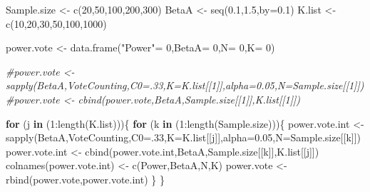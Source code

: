 \documentclass[
]{book}
\newenvironment{Shaded}{\begin{snugshade}}{\end{snugshade}}
\newcommand{\AttributeTok}[1]{\textcolor[rgb]{0.77,0.63,0.00}{#1}}
\newcommand{\CommentTok}[1]{\textcolor[rgb]{0.56,0.35,0.01}{\textit{#1}}}
\newcommand{\ControlFlowTok}[1]{\textcolor[rgb]{0.13,0.29,0.53}{\textbf{#1}}}
\newcommand{\DecValTok}[1]{\textcolor[rgb]{0.00,0.00,0.81}{#1}}
\newcommand{\FloatTok}[1]{\textcolor[rgb]{0.00,0.00,0.81}{#1}}
\newcommand{\FunctionTok}[1]{\textcolor[rgb]{0.00,0.00,0.00}{#1}}
\newcommand{\NormalTok}[1]{#1}
\newcommand{\OtherTok}[1]{\textcolor[rgb]{0.56,0.35,0.01}{#1}}
\newcommand{\SpecialCharTok}[1]{\textcolor[rgb]{0.00,0.00,0.00}{#1}}
\newcommand{\StringTok}[1]{\textcolor[rgb]{0.31,0.60,0.02}{#1}}
\theoremstyle{definition}
\theoremstyle{definition}
\theoremstyle{definition}
\theoremstyle{definition}
\theoremstyle{remark}
\begin{document}
\begin{Shaded}
\begin{Highlighting}[]
\NormalTok{Sample.size }\OtherTok{\textless{}{-}} \FunctionTok{c}\NormalTok{(}\DecValTok{20}\NormalTok{,}\DecValTok{50}\NormalTok{,}\DecValTok{100}\NormalTok{,}\DecValTok{200}\NormalTok{,}\DecValTok{300}\NormalTok{)}
\NormalTok{BetaA }\OtherTok{\textless{}{-}} \FunctionTok{seq}\NormalTok{(}\FloatTok{0.1}\NormalTok{,}\FloatTok{1.5}\NormalTok{,}\AttributeTok{by=}\FloatTok{0.1}\NormalTok{)}
\NormalTok{K.list }\OtherTok{\textless{}{-}} \FunctionTok{c}\NormalTok{(}\DecValTok{10}\NormalTok{,}\DecValTok{20}\NormalTok{,}\DecValTok{30}\NormalTok{,}\DecValTok{50}\NormalTok{,}\DecValTok{100}\NormalTok{,}\DecValTok{1000}\NormalTok{)}

\NormalTok{power.vote }\OtherTok{\textless{}{-}} \FunctionTok{data.frame}\NormalTok{(}\StringTok{"Power"}\OtherTok{=} \DecValTok{0}\NormalTok{,}\StringTok{\textquotesingle{}BetaA\textquotesingle{}}\OtherTok{=} \DecValTok{0}\NormalTok{,}\StringTok{\textquotesingle{}N\textquotesingle{}}\OtherTok{=} \DecValTok{0}\NormalTok{,}\StringTok{\textquotesingle{}K\textquotesingle{}}\OtherTok{=} \DecValTok{0}\NormalTok{)}
  
\CommentTok{\#power.vote \textless{}{-} sapply(BetaA,VoteCounting,C0=.33,K=K.list[[1]],alpha=0.05,N=Sample.size[[1]])}
\CommentTok{\#power.vote \textless{}{-} cbind(power.vote,BetaA,Sample.size[[1]],K.list[[1]])}

\ControlFlowTok{for}\NormalTok{ (j }\ControlFlowTok{in}\NormalTok{ (}\DecValTok{1}\SpecialCharTok{:}\FunctionTok{length}\NormalTok{(K.list)))\{}
  \ControlFlowTok{for}\NormalTok{ (k }\ControlFlowTok{in}\NormalTok{ (}\DecValTok{1}\SpecialCharTok{:}\FunctionTok{length}\NormalTok{(Sample.size)))\{}
\NormalTok{    power.vote.int }\OtherTok{\textless{}{-}} \FunctionTok{sapply}\NormalTok{(BetaA,VoteCounting,}\AttributeTok{C0=}\NormalTok{.}\DecValTok{33}\NormalTok{,}\AttributeTok{K=}\NormalTok{K.list[[j]],}\AttributeTok{alpha=}\FloatTok{0.05}\NormalTok{,}\AttributeTok{N=}\NormalTok{Sample.size[[k]])}
\NormalTok{    power.vote.int }\OtherTok{\textless{}{-}} \FunctionTok{cbind}\NormalTok{(power.vote.int,BetaA,Sample.size[[k]],K.list[[j]])}
    \FunctionTok{colnames}\NormalTok{(power.vote.int) }\OtherTok{\textless{}{-}} \FunctionTok{c}\NormalTok{(}\StringTok{\textquotesingle{}Power\textquotesingle{}}\NormalTok{,}\StringTok{\textquotesingle{}BetaA\textquotesingle{}}\NormalTok{,}\StringTok{\textquotesingle{}N\textquotesingle{}}\NormalTok{,}\StringTok{\textquotesingle{}K\textquotesingle{}}\NormalTok{)}
\NormalTok{    power.vote }\OtherTok{\textless{}{-}} \FunctionTok{rbind}\NormalTok{(power.vote,power.vote.int)  }
\NormalTok{  \}}
\NormalTok{\}}


\end{Highlighting}
\end{Shaded}
\end{document}
